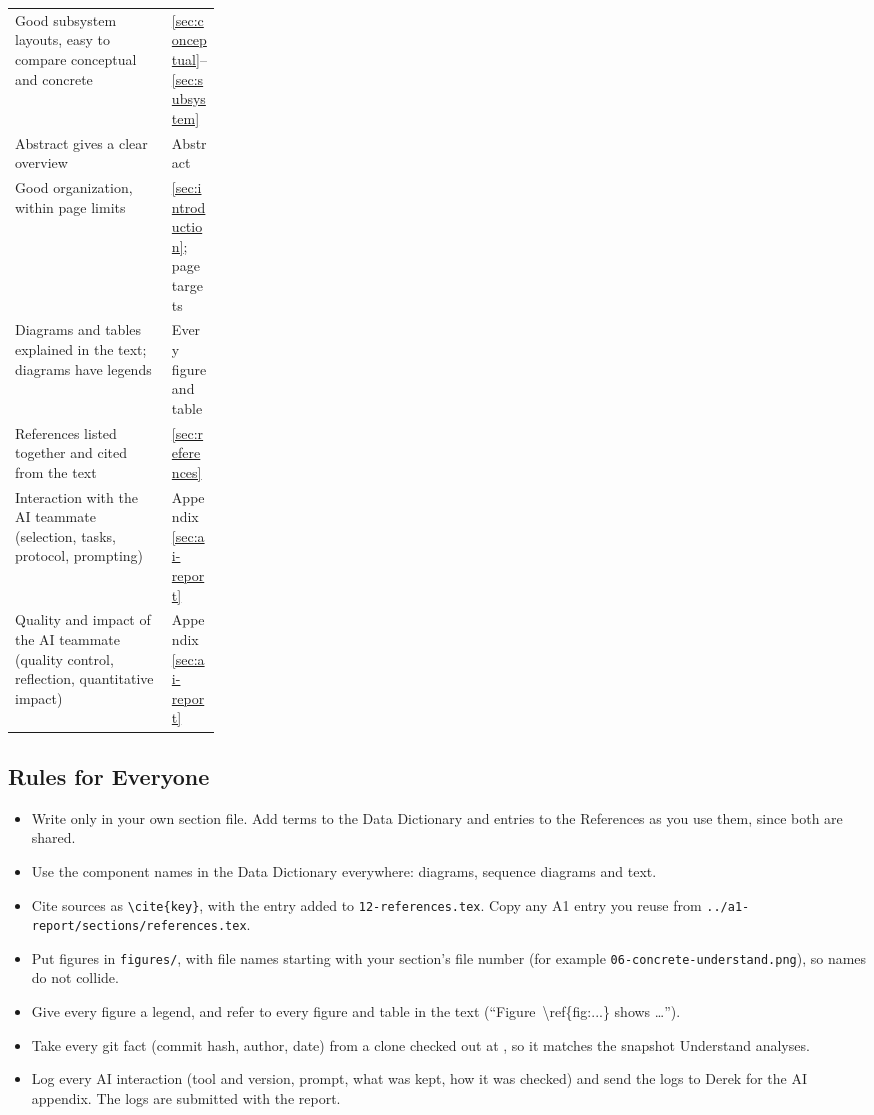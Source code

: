 \begin{center}
\begin{tabularx}{\linewidth}{@{}>{\raggedright\arraybackslash}X>{\raggedright\arraybackslash}p{0.24\linewidth}@{}}
  Good subsystem layouts, easy to compare conceptual and concrete & \ref{sec:conceptual}--\ref{sec:subsystem} \\
  Abstract gives a clear overview & Abstract \\
  Good organization, within page limits & \ref{sec:introduction}; page targets \\
  Diagrams and tables explained in the text; diagrams have legends & Every figure and table \\
  References listed together and cited from the text & \ref{sec:references} \\
  Interaction with the AI teammate (selection, tasks, protocol, prompting) & Appendix~\ref{sec:ai-report} \\
  Quality and impact of the AI teammate (quality control, reflection, quantitative impact) & Appendix~\ref{sec:ai-report} \\
  \bottomrule
\end{tabularx}
\end{center}

\subsection*{Rules for Everyone}

\begin{itemize}[itemsep=1pt]
  \item Write only in your own section file. Add terms to the Data Dictionary and entries to the References as you use them, since both are shared.
  \item Use the component names in the Data Dictionary everywhere: diagrams, sequence diagrams and text.
  \item Cite sources as \texttt{\textbackslash cite\{key\}}, with the entry added to \texttt{12-references.tex}. Copy any A1 entry you reuse from \texttt{../a1-report/sections/references.tex}.
  \item Put figures in \texttt{figures/}, with file names starting with your section's file number (for example \texttt{06-concrete-understand.png}), so names do not collide.
  \item Give every figure a legend, and refer to every figure and table in the text (``Figure~\textbackslash ref\{fig:...\} shows \ldots'').
  \item Take every git fact (commit hash, author, date) from a clone checked out at \pinnedcommit, so it matches the snapshot Understand analyses.
  \item Log every AI interaction (tool and version, prompt, what was kept, how it was checked) and send the logs to Derek for the AI appendix. The logs are submitted with the report.
\end{itemize}

